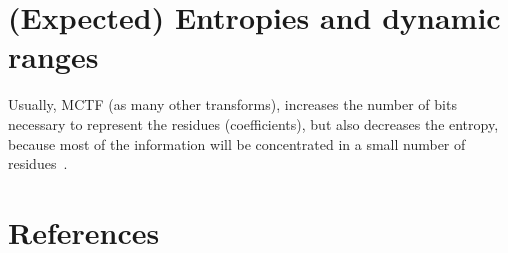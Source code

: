 
\section{(Expected) Entropies and  dynamic ranges}

Usually, MCTF (as many other transforms), increases the number of bits
necessary to represent the residues (coefficients), but also decreases
the entropy, because most of the information will be concentrated in a
small number of residues~\cite{vruiz__MC}.


\section{References}

\renewcommand{\addcontentsline}[3]{}%


